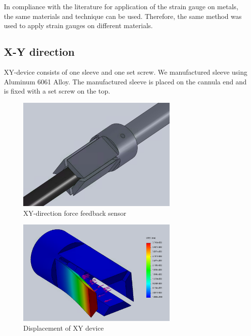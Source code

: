 	In compliance with the literature \cite{StrGugeInst} for application of the strain gauge on metals, the same materials and technique can be used. Therefore, the same method was used to apply strain gauges on different materials.

\subsection{X-Y direction}
\label{sec:xyDir}

XY-device consists of one sleeve and one set screw. We manufactured sleeve using Aluminum 6061 Alloy. %
The manufactured sleeve is placed on the cannula end and is fixed with a set screw on the top.

\begin{figure}[h]
	\begin{center}
		\includegraphics[width=80mm]{fig/methods/xy_dev_cl.png}
	\end{center}
	\vspace{-4mm}
	\caption[XY-direction force feedback sensor]
	{XY-direction force feedback sensor}
	\label{fig:xy-direction}
	\vspace{-2mm}
\end{figure}

\begin{figure}[h]
	\begin{center}
		\includegraphics[width=80mm]{fig/methods/old_sleeve_displ.png}
	\end{center}
	\vspace{-4mm}
	\caption[XY-direction force feedback sensor]
	{Displacement of XY device}
	\label{fig:xy-displ}
	\vspace{-2mm}
\end{figure}

